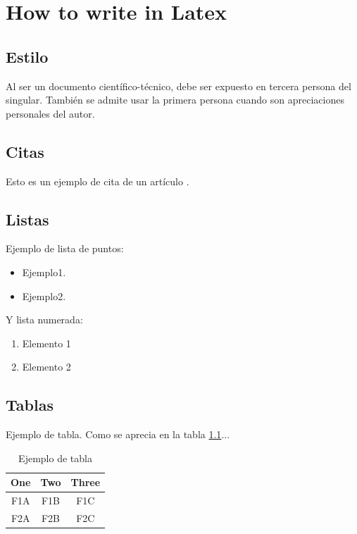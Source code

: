 \chapter{How to write in Latex}

\section{Estilo}

Al ser un documento científico-técnico, debe ser expuesto en tercera persona del singular. También se admite usar la primera persona cuando son apreciaciones personales del autor.

\section{Citas}


Esto es un ejemplo de cita de un artículo \cite{Brunete:2013}.


\section{Listas}

Ejemplo de lista de puntos:
\begin{itemize}
\item Ejemplo1.
\item Ejemplo2.
\end{itemize} 

Y lista numerada:
\begin{enumerate}
\item Elemento 1
\item Elemento 2
\end{enumerate}

\section{Tablas}

Ejemplo de tabla. Como se aprecia en la tabla \ref{tab:table_example}...
\begin{table}[tb]
\caption{Ejemplo de tabla}
\label{tab:table_example}
\begin{center}
\begin{tabular}{|c||c|c|}
\hline
One & Two & Three\\
\hline
\hline
F1A & F1B & F1C\\
F2A & F2B & F2C\\
\hline
\end{tabular}
\end{center}
\end{table}

